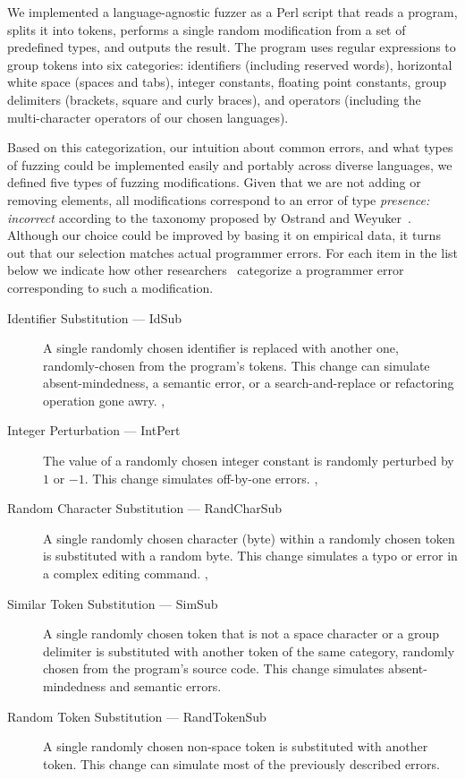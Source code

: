 \documentclass[10pt]{sigplanconf}
\begin{document}
We implemented a language-agnostic fuzzer as a Perl script
that reads a program,
splits it into tokens,
performs a single random modification from a set of
predefined types,
and outputs the result.
The program uses regular expressions to group tokens into
six categories:
identifiers (including reserved words),
horizontal white space (spaces and tabs),
integer constants,
floating point constants,
group delimiters (brackets, square and curly braces), and
operators (including the multi-character operators of our chosen languages).

Based on this categorization,
our intuition about common errors, and
what types of fuzzing could be implemented easily and portably across
diverse languages,
we defined five types of fuzzing modifications.
Given that we are not adding or removing elements,
all modifications correspond to an error of type
{\em presence: incorrect} according to the taxonomy proposed
by Ostrand and Weyuker~\cite{OW84}.
Although our choice could be improved by basing it on empirical data,
it turns out that our selection matches actual programmer errors.
For each item in the list below we indicate how other
researchers~\cite{End75,KNUTH89} categorize a programmer error
corresponding to such a modification.

\begin{description}
\item [Identifier Substitution --- IdSub]
A single randomly chosen identifier is replaced with another one,
randomly-chosen from the program's tokens.
This change can simulate absent-mindedness, a semantic error, or
a search-and-replace or refactoring operation gone awry.
\cite[B3.b]{End75},
\cite[B]{KNUTH89}
\item [Integer Perturbation --- IntPert]
The value of a randomly chosen integer constant
is randomly perturbed by $1$ or $-1$.
This change simulates off-by-one errors.
\cite[B4.b]{End75},
\cite[A]{KNUTH89}
\item [Random Character Substitution --- RandCharSub]
A single randomly chosen character (byte) within a randomly chosen token
is substituted with a random byte.
This change simulates a typo or error in a complex editing command.
\cite[C1]{End75},
\cite[T]{KNUTH89}
\item [Similar Token Substitution --- SimSub]
A single randomly chosen token
that is not a space character or a group delimiter
is substituted with another token of the same category,
randomly chosen from the program's source code.
This change simulates absent-mindedness and semantic errors.
\cite[B]{KNUTH89}
\item [Random Token Substitution --- RandTokenSub]
A single randomly chosen non-space token
is substituted with another token.
This change can simulate most of the previously described errors.
\cite[T, B]{KNUTH89}
\end{description}
\end{document}
